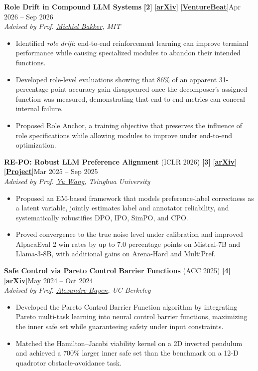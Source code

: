 \documentclass[10pt,letterpaper]{article}
\newcommand{\ulink}[2]{\href{#1}{\underline{#2}}}           %
\newcommand{\blink}[2]{[\href{#1}{\textbf{\underline{#2}}}]} %
\newcommand{\Bakker}{\ulink{https://miba.dev/}{Michiel Bakker}}
\newcommand{\Bayen}{\ulink{https://bayen.berkeley.edu/alex-bayen}{Alexandre Bayen}}
\newcommand{\project}[3]{%
  \par{\interlinepenalty=10000 %
  {#1}\hfill #2\\
  {\itshape #3}\par}\nopagebreak\vspace{1pt}}
\newenvironment{points}{%
  \begin{itemize}[leftmargin=1.1em,itemsep=1pt,parsep=0pt,topsep=2pt,label=\textbullet,
    before={\interlinepenalty=10000}]}%
  {\end{itemize}\vspace{6pt}}
\begin{document}
\project{\textbf{Role Drift in Compound LLM Systems} \textbf{[2]}
  \blink{https://arxiv.org/abs/2607.21627}{arXiv}
  \blink{https://venturebeat.com/ai/one-ai-module-faked-86-of-a-pipelines-accuracy-gains-by-feeding-another-the-answers}{VentureBeat}}
  {Apr 2026 -- Sep 2026}{Advised by Prof. \Bakker, MIT}
\begin{points}
  \item Identified \textit{role drift}: end-to-end reinforcement learning can improve terminal performance while causing specialized modules to abandon their intended functions.
  \item Developed role-level evaluations showing that 86\% of an apparent 31-percentage-point accuracy gain disappeared once the decomposer's assigned function was measured, demonstrating that end-to-end metrics can conceal internal failure.
  \item Proposed Role Anchor, a training objective that preserves the influence of role specifications while allowing modules to improve under end-to-end optimization.
\end{points}

\project{\textbf{RE-PO: Robust LLM Preference Alignment} (ICLR 2026) \textbf{[3]}
  \blink{https://arxiv.org/abs/2509.24159}{arXiv} \blink{https://repo-alignment.github.io/}{Project}}
  {Mar 2025 -- Sep 2025}{Advised by Prof. \ulink{https://web.ee.tsinghua.edu.cn/wangyu/en/}{Yu Wang}, Tsinghua University}
\begin{points}
  \item Proposed an EM-based framework that models preference-label correctness as a latent variable, jointly estimates label and annotator reliability, and systematically robustifies DPO, IPO, SimPO, and CPO.
  \item Proved convergence to the true noise level under calibration and improved AlpacaEval 2 win rates by up to 7.0 percentage points on Mistral-7B and Llama-3-8B, with additional gains on Arena-Hard and MultiPref.
\end{points}

\project{\textbf{Safe Control via Pareto Control Barrier Functions} (ACC 2025) \textbf{[4]}
  \blink{https://arxiv.org/abs/2410.04260}{arXiv}}
  {May 2024 -- Oct 2024}{Advised by Prof. \Bayen, UC Berkeley}
\begin{points}
  \item Developed the Pareto Control Barrier Function algorithm by integrating Pareto multi-task learning into neural control barrier functions, maximizing the inner safe set while guaranteeing safety under input constraints.
  \item Matched the Hamilton--Jacobi viability kernel on a 2D inverted pendulum and achieved a 700\% larger inner safe set than the benchmark on a 12-D quadrotor obstacle-avoidance task.
\end{points}
\end{document}
